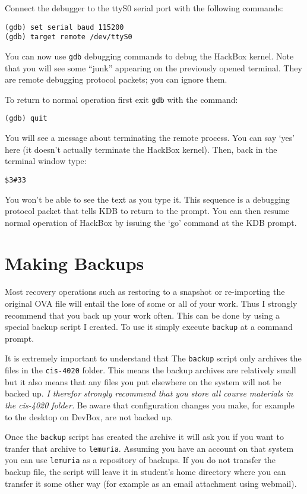 \documentclass[twocolumn]{article}
\begin{document}
Connect the debugger to the ttyS0 serial port with the following commands:
\begin{Verbatim}
(gdb) set serial baud 115200
(gdb) target remote /dev/ttyS0
\end{Verbatim}

You can now use \texttt{gdb} debugging commands to debug the HackBox kernel. Note that you will
see some ``junk'' appearing on the previously opened terminal. They are remote debugging
protocol packets; you can ignore them.

To return to normal operation first exit \texttt{gdb} with the command:
\begin{Verbatim}
(gdb) quit
\end{Verbatim}
You will see a message about terminating the remote process. You can say `yes' here (it doesn't
actually terminate the HackBox kernel). Then, back in the terminal window type:
\begin{Verbatim}
$3#33
\end{Verbatim}
You won't be able to see the text as you type it. This sequence is a debugging protocol packet
that tells KDB to return to the prompt. You can then resume normal operation of HackBox by
issuing the `go' command at the KDB prompt.

\section{Making Backups}

Most recovery operations such as restoring to a snapshot or re-importing the original OVA file
will entail the lose of some or all of your work. Thus I strongly recommend that you back up
your work often. This can be done by using a special backup script I created. To use it simply
execute \texttt{backup} at a command prompt.

It is extremely important to understand that The \texttt{backup} script only archives the files
in the \texttt{cis-4020} folder. This means the backup archives are relatively small but it also
means that any files you put elsewhere on the system will not be backed up. \emph{I therefor
  strongly recommend that you store all course materials in the cis-4020 folder.} Be aware that
configuration changes you make, for example to the desktop on DevBox, are not backed up.

Once the \texttt{backup} script has created the archive it will ask you if you want to tranfer
that archive to \texttt{lemuria}. Assuming you have an account on that system you can use
\texttt{lemuria} as a repository of backups. If you do not transfer the backup file, the script
will leave it in student's home directory where you can transfer it some other way (for example
as an email attachment using webmail).
\end{document}
